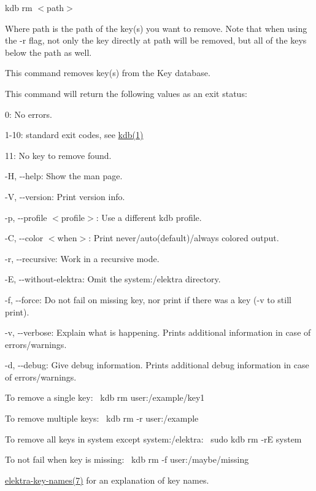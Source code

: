 {\ttfamily kdb rm $<$path$>$}

Where {\ttfamily path} is the path of the key(s) you want to remove. Note that when using the {\ttfamily -\/r} flag, not only the key directly at {\ttfamily path} will be removed, but all of the keys below the path as well.

This command removes key(s) from the Key database.

This command will return the following values as an exit status\+:


\begin{DoxyItemize}
\item 0\+: No errors.
\item 1-\/10\+: standard exit codes, see \hyperlink{doc_help_kdb_md}{kdb(1)}
\item 11\+: No key to remove found.
\end{DoxyItemize}


\begin{DoxyItemize}
\item {\ttfamily -\/H}, {\ttfamily -\/-\/help}\+: Show the man page.
\item {\ttfamily -\/V}, {\ttfamily -\/-\/version}\+: Print version info.
\item {\ttfamily -\/p}, {\ttfamily -\/-\/profile $<$profile$>$}\+: Use a different kdb profile.
\item {\ttfamily -\/C}, {\ttfamily -\/-\/color $<$when$>$}\+: Print never/auto(default)/always colored output.
\item {\ttfamily -\/r}, {\ttfamily -\/-\/recursive}\+: Work in a recursive mode.
\item {\ttfamily -\/E}, {\ttfamily -\/-\/without-\/elektra}\+: Omit the {\ttfamily system\+:/elektra} directory.
\item {\ttfamily -\/f}, {\ttfamily -\/-\/force}\+: Do not fail on missing key, nor print if there was a key (-\/v to still print).
\item {\ttfamily -\/v}, {\ttfamily -\/-\/verbose}\+: Explain what is happening. Prints additional information in case of errors/warnings.
\item {\ttfamily -\/d}, {\ttfamily -\/-\/debug}\+: Give debug information. Prints additional debug information in case of errors/warnings.
\end{DoxyItemize}

To remove a single key\+:~\newline
 {\ttfamily kdb rm user\+:/example/key1}

To remove multiple keys\+:~\newline
 {\ttfamily kdb rm -\/r user\+:/example}

To remove all keys in {\ttfamily system} except {\ttfamily system\+:/elektra}\+:~\newline
 {\ttfamily sudo kdb rm -\/rE system}

To not fail when key is missing\+:~\newline
 {\ttfamily kdb rm -\/f user\+:/maybe/missing}


\begin{DoxyItemize}
\item \hyperlink{doc_help_elektra-key-names_md}{elektra-\/key-\/names(7)} for an explanation of key names. 
\end{DoxyItemize}